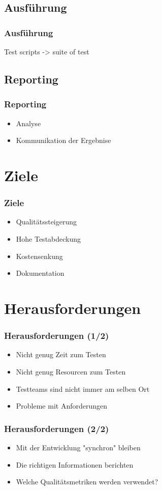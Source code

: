 \subsection{Ausf\"uhrung}
\begin{frame}
	\frametitle{Ausf\"uhrung}
	Test scripts -> suite of test
\end{frame}

\subsection{Reporting}
\begin{frame}
	\frametitle{Reporting}
	\begin{itemize}
		\item Analyse
		\item Kommunikation der Ergebnise
	\end{itemize}
\end{frame}

\section{Ziele}
\begin{frame}
	\frametitle{Ziele}
	\begin{itemize}
		\item Qualit\"atssteigerung
		\item Hohe Testabdeckung
		\item Kostensenkung
		\item Dokumentation
	\end{itemize}
\end{frame}

\section{Herausforderungen}
\begin{frame}
	\frametitle{Herausforderungen (1/2)}
	\begin{itemize}
		\item Nicht genug Zeit zum Testen
		\item Nicht genug Resourcen zum Testen
		\item Testteams sind nicht immer am selben Ort
		\item Probleme mit Anforderungen
	\end{itemize}
\end{frame}

\begin{frame}
	\frametitle{Herausforderungen (2/2)}
	\begin{itemize}
		\item Mit der Entwicklung "synchron" bleiben
		\item Die richtigen Informationen berichten
		\item Welche Qualit\"atsmetriken werden verwendet?
	\end{itemize}
\end{frame}

